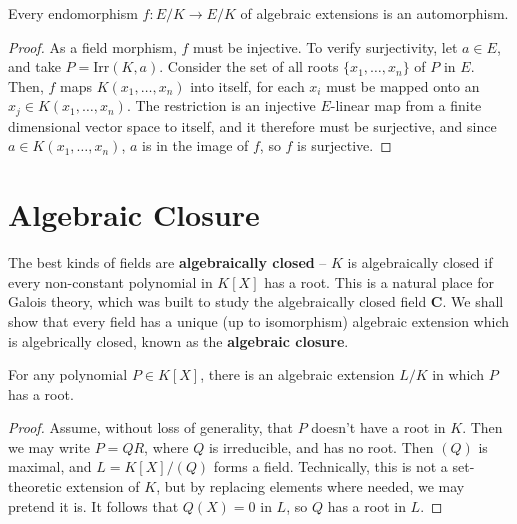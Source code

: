 \begin{corollary}
    Every endomorphism $f: E/K \to E/K$ of algebraic extensions is an automorphism.
\end{corollary}
\begin{proof}
    As a field morphism, $f$ must be injective. To verify surjectivity, let $a \in E$, and take $P = \text{Irr}(K,a)$. Consider the set of all roots $\{ x_1, \dots, x_n \}$ of $P$ in $E$. Then, $f$ maps $K(x_1, \dots, x_n)$ into itself, for each $x_i$ must be mapped onto an $x_j \in K(x_1, \dots, x_n)$. The restriction is an injective $E$-linear map from a finite dimensional vector space to itself, and it therefore must be surjective, and since $a \in K(x_1, \dots, x_n)$, $a$ is in the image of $f$, so $f$ is surjective.
\end{proof}

\section{Algebraic Closure}

The best kinds of fields are {\bf algebraically closed} -- $K$ is algebraically closed if every non-constant polynomial in $K[X]$ has a root. This is a natural place for Galois theory, which was built to study the algebraically closed field $\mathbf{C}$. We shall show that every field has a unique (up to isomorphism) algebraic extension which is algebrically closed, known as the {\bf algebraic closure}.

\begin{lemma}
    For any polynomial $P \in K[X]$, there is an algebraic extension $L/K$ in which $P$ has a root.
\end{lemma}
\begin{proof}
    Assume, without loss of generality, that $P$ doesn't have a root in $K$. Then we may write $P = QR$, where $Q$ is irreducible, and has no root. Then $(Q)$ is maximal, and $L = K[X]/(Q)$ forms a field. Technically, this is not a set-theoretic extension of $K$, but by replacing elements where needed, we may pretend it is. It follows that $Q(X) = 0$ in $L$, so $Q$ has a root in $L$.
\end{proof}


